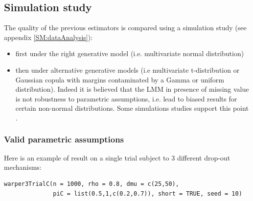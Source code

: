 \documentclass[12pt]{article}
\begin{document}
\clearpage

\subsection{Simulation study}
\label{sec:org2e65e9f}

The quality of the previous estimators is compared using a simulation
study (see appendix \ref{SM:dataAnalysis}):
\begin{itemize}
\item first under the right generative model (i.e. multivariate normal distribution)
\item then under alternative generative models (i.e multivariate
t-distribution or Gaussian copula with margins contaminated by a
Gamma or uniform distribution). Indeed it is believed that the LMM
in presence of missing value is not robustness to parametric
assumptions, i.e. lead to biased results for certain non-normal
distributions. Some simulations studies support this point
\citep{lu2009impact}.
\end{itemize}

\subsubsection{Valid parametric assumptions}
\label{sec:orga033992}

Here is an example of result on a single trial subject to 3 different
drop-out mechanisms:
\lstset{language=r,label= ,caption= ,captionpos=b,numbers=none}
\begin{lstlisting}
warper3TrialC(n = 1000, rho = 0.8, dmu = c(25,50),
              piC = list(0.5,1,c(0.2,0.7)), short = TRUE, seed = 10)
\end{lstlisting}
\end{document}
